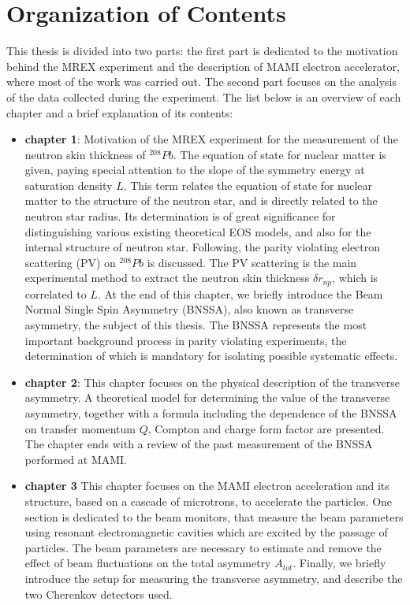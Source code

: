 \chapter*{Organization of Contents}

This thesis is divided into two parts: the first part is dedicated to the motivation behind the MREX experiment and the description of MAMI electron accelerator, where most of the work was carried out. The second part focuses on the analysis of the data collected during the experiment. The list below is an overview of each chapter and a brief explanation of its contents:

\begin{itemize}
\item \textbf{chapter 1}: Motivation of the MREX experiment for the measurement of the neutron skin thickness of $^{208}Pb$. The equation of state for nuclear matter is given, paying special attention to the slope of the symmetry energy at saturation density $L$. This term relates the equation of state for nuclear matter to the structure of the neutron star, and is directly related to the neutron star radius. Its determination is of great significance for distinguishing various existing theoretical EOS models, and also for the internal structure of neutron star. Following, the parity violating electron scattering (PV) on $^{208}Pb$ is discussed. The PV scattering is the main experimental method to extract the neutron skin thickness $\delta r_{np}$, which is correlated to $L$. At the end of this chapter, we briefly introduce the Beam Normal Single Spin Asymmetry (BNSSA), also known as transverse asymmetry, the subject of this thesis. The BNSSA represents the most important background process in parity violating experiments, the determination of which is mandatory for isolating possible systematic effects. 
\item \textbf{chapter 2}: This chapter focuses on the physical description of the transverse asymmetry. A theoretical model for determining the value of the transverse asymmetry, together with a formula including the dependence of the BNSSA on transfer momentum $Q$, Compton and charge form factor are presented. The chapter ends with a review of the past measurement of the BNSSA performed at MAMI.  
\item \textbf{chapter 3} This chapter focuses on the MAMI electron acceleration and its structure, based on a cascade of microtrons, to accelerate the particles. One section is dedicated to the beam monitors, that measure the beam parameters using resonant electromagnetic cavities which are excited by the passage of particles. The beam parameters are necessary to estimate and remove the effect of beam fluctuations on the total asymmetry $A_{tot}$. Finally, we briefly introduce  the setup for measuring the transverse asymmetry, and describe the two Cherenkov detectors used.

\end{itemize}
